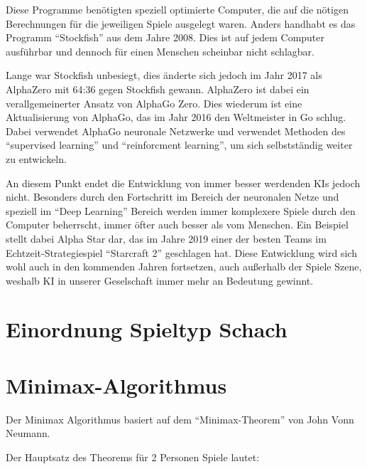 
Diese Programme benötigten speziell optimierte Computer, die auf die nötigen Berechnungen für die jeweiligen Spiele ausgelegt waren. Anders handhabt es das Programm ``Stockfish'' aus dem Jahre 2008. Dies ist auf jedem Computer ausführbar und dennoch für einen Menschen scheinbar nicht schlagbar.

Lange war Stockfish unbesiegt, dies änderte sich jedoch im Jahr 2017 als AlphaZero mit 64:36 gegen Stockfish gewann. AlphaZero ist dabei ein verallgemeinerter Ansatz von AlphaGo Zero. Dies wiederum ist eine Aktualisierung von AlphaGo, das im Jahr 2016 den Weltmeister in Go schlug. Dabei verwendet AlphaGo neuronale Netzwerke und verwendet Methoden des ``supervised learning'' und ``reinforcment learning'', um sich selbstständig weiter zu entwickeln.


An diesem Punkt endet die Entwicklung von immer besser werdenden KIs jedoch nicht. Besonders durch den Fortschritt im Bereich der neuronalen Netze und speziell im ``Deep Learning'' Bereich werden immer komplexere Spiele durch den Computer beherrscht, immer öfter auch besser als vom Menschen. Ein Beispiel stellt dabei Alpha Star dar, das im Jahre 2019 einer der besten Teams im Echtzeit-Strategiespiel ``Starcraft 2'' geschlagen hat. Diese Entwicklung wird sich wohl auch in den kommenden Jahren fortsetzen, auch außerhalb der Spiele Szene, weshalb KI in unserer Geselschaft immer mehr an Bedeutung gewinnt.



\section{Einordnung Spieltyp Schach}

\section{Minimax-Algorithmus}


Der Minimax Algorithmus basiert auf dem ``Minimax-Theorem''  von John Vonn Neumann.

Der Hauptsatz des Theorems für 2 Personen Spiele lautet:


